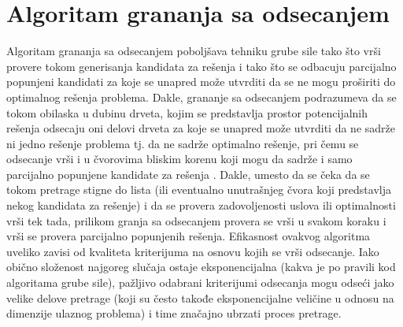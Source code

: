 \documentclass[12pt,oneside]{memoir}
\begin{document}
\section{Algoritam grananja sa odsecanjem}
\label{sec:algGrananjaSaOdsecanjem}
Algoritam grananja sa odsecanjem poboljšava tehniku grube sile tako što vrši provere tokom generisanja
kandidata za rešenja i tako što se odbacuju parcijalno popunjeni kandidati za koje se unapred može utvrditi
da se ne mogu proširiti do optimalnog rešenja problema. Dakle, grananje sa odsecanjem podrazumeva da se tokom
obilaska u dubinu drveta, kojim se predstavlja prostor potencijalnih rešenja odsecaju oni delovi drveta za koje se unapred
može utvrditi da ne sadrže ni jedno rešenje problema tj. da ne sadrže optimalno rešenje, pri čemu se odsecanje vrši
i u čvorovima bliskim korenu koji mogu da sadrže i samo parcijalno popunjene kandidate za rešenja \cite{PetljaBackTracking}.
Dakle, umesto da se čeka da se tokom pretrage stigne do lista (ili eventualno unutrašnjeg čvora koji predstavlja
nekog kandidata za rešenje) i da se provera zadovoljenosti uslova ili optimalnosti vrši tek tada, prilikom granja sa
odsecanjem provera se vrši u svakom koraku i vrši se provera parcijalno popunjenih rešenja.
Efikasnost ovakvog algoritma uveliko zavisi od kvaliteta kriterijuma na osnovu kojih se vrši odsecanje. Iako obično
složenost najgoreg slučaja ostaje eksponencijalna (kakva je po pravili kod algoritama grube sile), pažljivo odabrani
kriterijumi odsecanja mogu odseći jako velike delove pretrage (koji su često takođe eksponencijalne veličine u odnosu
na dimenzije ulaznog problema) i time značajno ubrzati proces pretrage.
\end{document}
